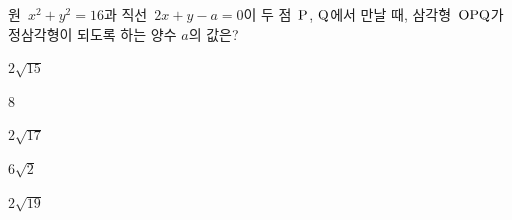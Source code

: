 원~$x^2+y^2=16$과 직선~$2x+y-a=0$이 두 점~$\mathrm{P}$, $\mathrm{Q}$에서 만날 때, 삼각형~$\mathrm{OPQ}$가 정삼각형이 되도록 하는 양수 $a$의 값은? 
\begin{choices32}{\rule[-3ex]{0pt}{8ex}$2\sqrt{15}$}{\rule[-3ex]{0pt}{8ex}$8$}{\rule[-3ex]{0pt}{8ex}$2\sqrt{17}$}{\rule[-3ex]{0pt}{8ex}$6\sqrt{2}$}{\rule[-3ex]{0pt}{8ex}$2\sqrt{19}$}\end{choices32}
